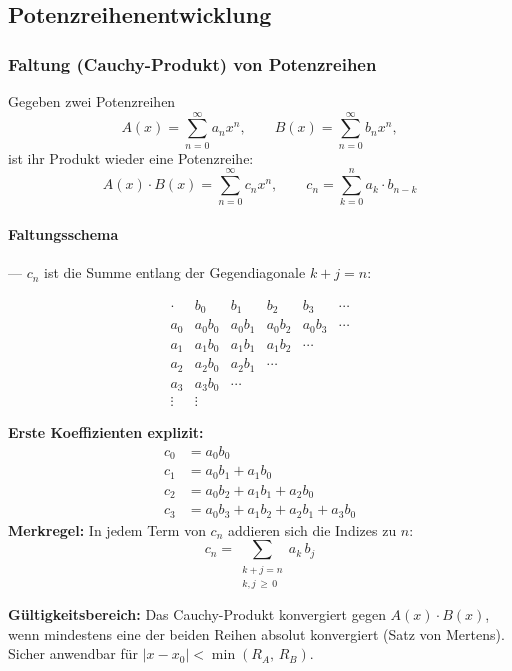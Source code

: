 \documentclass[../zusammenfassung_AN.tex]{subfiles}
\begin{document}
	
	\subsection{Potenzreihenentwicklung}
	
	\subsubsection{Faltung (Cauchy-Produkt) von Potenzreihen}
	
	\begin{tcolorbox}[dglbox, title={Cauchy-Produkt}]
		Gegeben zwei Potenzreihen
		\[
		A(x) = \sum_{n=0}^{\infty} a_n x^n, \qquad B(x) = \sum_{n=0}^{\infty} b_n x^n,
		\]
		ist ihr Produkt wieder eine Potenzreihe:
		\[
		A(x)\cdot B(x) = \sum_{n=0}^{\infty} c_n x^n, \qquad
		\boxed{c_n = \sum_{k=0}^{n} a_k \cdot b_{n-k}}
		\]
	\end{tcolorbox}
	
	\paragraph{Faltungsschema} — $c_n$ ist die Summe entlang der Gegendiagonale $k+j=n$:
	
	\[
	\begin{array}{c|ccccc}
		\cdot  & b_0       & b_1       & b_2       & b_3       & \cdots \\\hline
		a_0    & a_0 b_0   & a_0 b_1   & a_0 b_2   & a_0 b_3   & \cdots \\
		a_1    & a_1 b_0   & a_1 b_1   & a_1 b_2   & \cdots    &        \\
		a_2    & a_2 b_0   & a_2 b_1   & \cdots    &           &        \\
		a_3    & a_3 b_0   & \cdots    &           &           &        \\
		\vdots & \vdots    &           &           &           &
	\end{array}
	\]
	
	\begin{tcolorbox}[formelbox]
		\textbf{Erste Koeffizienten explizit:}
		\begin{align*}
			c_0 &= a_0 b_0 \\
			c_1 &= a_0 b_1 + a_1 b_0 \\
			c_2 &= a_0 b_2 + a_1 b_1 + a_2 b_0 \\
			c_3 &= a_0 b_3 + a_1 b_2 + a_2 b_1 + a_3 b_0
		\end{align*}
		\textbf{Merkregel:} In jedem Term von $c_n$ addieren sich die Indizes zu $n$:
		\[
		c_n = \sum_{\substack{k+j=n \\ k,j\,\geq\,0}} a_k\,b_j
		\]
	\end{tcolorbox}
	
	\begin{tcolorbox}[hinweis]
		\textbf{Gültigkeitsbereich:} Das Cauchy-Produkt konvergiert gegen $A(x)\cdot B(x)$,
		wenn mindestens eine der beiden Reihen absolut konvergiert (Satz von Mertens).\\
		Sicher anwendbar für $|x-x_0| < \min(R_A,\,R_B)$.
	\end{tcolorbox}
	
\end{document}
